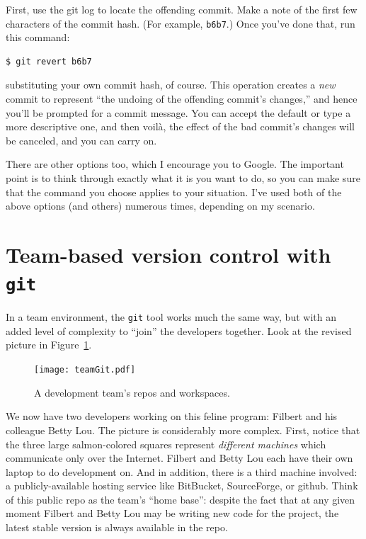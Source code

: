 \begin{itemize}
First, use the git log to locate the offending commit. Make a note of the first
few characters of the commit hash. (For example, \texttt{b6b7}.) Once you've
done that, run this command:

\vspace{-.1in}
\begin{Verbatim}[fontsize=\small,samepage=true,frame=none]
  $ git revert b6b7
\end{Verbatim}
\vspace{-.1in}

substituting your own commit hash, of course. This operation creates a
\textit{new} commit to represent ``the undoing of the offending commit's
changes,'' and hence you'll be prompted for a commit message. You can accept
the default or type a more descriptive one, and then voil\`{a}, the effect of
the bad commit's changes will be canceled, and you can carry on.

\end{itemize}

There are other options too, which I encourage you to Google. The important
point is to think through exactly what it is you want to do, so you can make
sure that the command you choose applies to your situation. I've used both of
the above options (and others) numerous times, depending on my scenario.





\vfill
\pagebreak

\section{Team-based version control with \texttt{git}}

In a team environment, the \texttt{git} tool works much the same way, but with
an added level of complexity to ``join'' the developers together. Look at the
revised picture in Figure~\ref{fig:teamGit}.

\begin{figure}[hb]
\centering
\hspace*{-.1in}
\texttt{[image: teamGit.pdf]}  %
\caption{A development team's repos and workspaces.}
\label{fig:teamGit}
\end{figure}

We now have two developers working on this feline program: Filbert and his
colleague Betty Lou. The picture is considerably more complex. First, notice
that the three large salmon-colored squares represent \textit{different machines}
which communicate only over the Internet. Filbert and Betty Lou each have
their own laptop to do development on. And in addition, there is a third
machine involved: a publicly-available hosting service like BitBucket,
SourceForge, or github. Think of this public repo as the team's ``home base'':
despite the fact that at any given moment Filbert and Betty Lou may be writing
new code for the project, the latest stable version is always available in the
repo.

